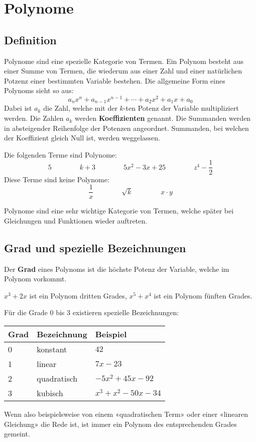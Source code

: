 \newpage
\section{Polynome}

\subsection{Definition}

Polynome sind eine spezielle Kategorie von Termen. Ein Polynom besteht aus einer Summe von Termen, die wiederum aus einer Zahl und einer natürlichen Potzenz einer bestimmten Variable bestehen. Die allgemeine Form eines Polynoms sieht so aus:
\[
  a_{n}x^{n} + a_{n-1}x^{n-1} + \cdots + a_{2}x^{2} + a_{1}x + a_{0}
\]
Dabei ist $a_{k}$ die Zahl, welche mit der $k$-ten Potenz der Variable multipliziert werden. Die Zahlen $a_{k}$ werden \textbf{Koeffizienten} genannt. Die Summanden werden in absteigender Reihenfolge der Potenzen angeordnet. Summanden, bei welchen der Koeffizient gleich Null ist, werden weggelassen.

\begin{example}
  Die folgenden Terme sind Polynome:
  \[
    5 \qquad\qquad k+3 \qquad\qquad 5x^{2}-3x+25 \qquad\qquad z^{4}-\frac{1}{2}
  \]
  Diese Terme sind keine Polynome:
  \[
    \frac{1}{x} \qquad\qquad \sqrt{k} \qquad\qquad x\cdot y
  \]
\end{example}

Polynome sind eine sehr wichtige Kategorie von Termen, welche später bei Gleichungen und Funktionen wieder auftreten.

\subsection{Grad und spezielle Bezeichnungen}

Der \textbf{Grad} eines Polynoms ist die höchste Potenz der Variable, welche im Polynom vorkommt.

\begin{example}
  $x^{3}+2x$ ist ein Polynom dritten Grades, $x^{5}+x^{4}$ ist ein Polynom fünften Grades.
\end{example}

Für die Grade 0 bis 3 existieren spezielle Bezeichnungen:
\begin{center}
  \def\arraystretch{1.1}
  \begin{tabularx}{0.9\textwidth}{XXR}
  \toprule
    \textbf{Grad} & \textbf{Bezeichnung} & \textbf{Beispiel} \\
   & konstant & $42$ \\
   & linear & $7x-23$ \\
   & quadratisch & $-5x^{2}+45x-92$ \\
   & kubisch & $x^{3}+x^{2}-50x-34$ \\
  \bottomrule
  \end{tabularx}
\end{center}

Wenn also beispielsweise von einem «quadratischen Term» oder einer «linearen Gleichung» die Rede ist, ist immer ein Polynom des entsprechenden Grades gemeint.
